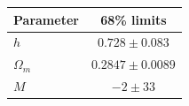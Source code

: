 \begin{tabular} { l  c}

 Parameter &  68\% limits\\
\hline
{\boldmath$h              $} & $0.728\pm 0.083            $\\

{\boldmath$\Omega_m       $} & $0.2847\pm 0.0089          $\\

{\boldmath$M              $} & $-2\pm 33                  $\\
\hline
\end{tabular}